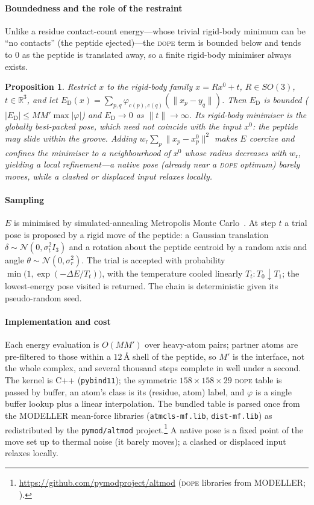 \documentclass[11pt]{article}
\theoremstyle{oldplain}
\newtheorem{proposition}{Proposition}
\theoremstyle{oldrem}
\newcommand{\R}{\mathbb{R}}
\newcommand{\xref}{x^{0}}
\begin{document}
\paragraph{Boundedness and the role of the restraint} Unlike a residue contact-count energy---whose
trivial rigid-body minimum can be ``no contacts'' (the peptide ejected)---the \textsc{dope} term is
bounded below and tends to $0$ as the peptide is translated away, so a finite rigid-body minimiser
always exists.
\begin{proposition}\label{prop:restraint}
Restrict $x$ to the rigid-body family $x=R\xref+t$, $R\in SO(3)$, $t\in\R^3$, and let $E_{\mathrm
D}(x)=\sum_{p,q}\varphi_{c(p),c(q)}(\lVert x_p-y_q\rVert)$. Then $E_{\mathrm D}$ is bounded
($|E_{\mathrm D}|\le M M'\max|\varphi|$) and $E_{\mathrm D}\to 0$ as $\lVert t\rVert\to\infty$. Its
rigid-body minimiser is the globally best-packed pose, which need not coincide with the input
$\xref$: the peptide may slide within the groove. Adding $w_{\mathrm r}\sum_p\lVert
x_p-\xref_p\rVert^2$ makes $E$ coercive and confines the minimiser to a neighbourhood of $\xref$
whose radius decreases with $w_{\mathrm r}$, yielding a \emph{local} refinement---a native pose
(already near a \textsc{dope} optimum) barely moves, while a clashed or displaced input relaxes
locally.
\end{proposition}

\paragraph{Sampling} $E$ is minimised by simulated-annealing Metropolis Monte
Carlo~\cite{Metropolis1953,Kirkpatrick1983}. At step $t$ a trial pose is proposed by a rigid move of
the peptide: a Gaussian translation $\delta\sim\mathcal N(0,\sigma_t^2 I_3)$ and a rotation about the
peptide centroid by a random axis and angle $\theta\sim\mathcal N(0,\sigma_r^2)$. The trial is
accepted with probability $\min\!\bigl(1,\exp(-\Delta E/T_t)\bigr)$, with the temperature cooled
linearly $T_t:T_0\!\downarrow\!T_1$; the lowest-energy pose visited is returned. The chain is
deterministic given its pseudo-random seed.

\paragraph{Implementation and cost} Each energy evaluation is $O(MM')$ over heavy-atom pairs;
partner atoms are pre-filtered to those within a $12\,\text{\AA}$ shell of the peptide, so $M'$ is
the interface, not the whole complex, and several thousand steps complete in well under a second.
The kernel is C++ (\texttt{pybind11}); the symmetric $158\times158\times29$ \textsc{dope} table is
passed by buffer, an atom's class is its (residue, atom) label, and $\varphi$ is a single buffer
lookup plus a linear interpolation. The bundled table is parsed once from the MODELLER mean-force
libraries (\texttt{atmcls-mf.lib}, \texttt{dist-mf.lib}) as redistributed by the \texttt{pymod/altmod}
project.\footnote{\url{https://github.com/pymodproject/altmod} (\textsc{dope} libraries from MODELLER;
\cite{Shen2006}).} A native pose is a fixed point of the move set up to thermal noise (it barely
moves); a clashed or displaced input relaxes locally.
\end{document}
